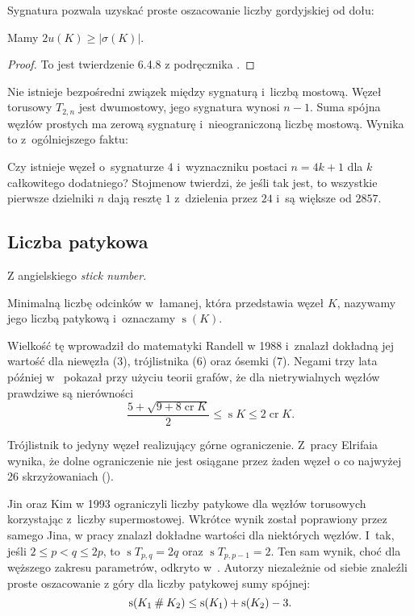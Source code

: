 Sygnatura pozwala uzyskać proste oszacowanie liczby gordyjskiej od dołu:

\begin{proposition}
    Mamy $2 u(K) \ge |\sigma(K)|$.
\end{proposition}

\begin{proof}
    To jest twierdzenie 6.4.8 z podręcznika \cite{murasugi96}.
\end{proof}

Nie istnieje bezpośredni związek między sygnaturą i~liczbą mostową.
Węzeł torusowy $T_{2,n}$ jest dwumostowy, jego sygnatura wynosi $n - 1$.
Suma spójna węzłów prostych ma zerową sygnaturę i~nieograniczoną liczbę mostową.
Wynika to z~ogólniejszego faktu:


Czy istnieje węzeł o~sygnaturze $4$ i~wyznaczniku postaci $n = 4k + 1$ dla $k$ całkowitego dodatniego?
Stojmenow twierdzi, że jeśli tak jest, to wszystkie pierwsze dzielniki $n$ dają resztę $1$ z~dzielenia przez $24$ i~są większe od $2857$.


\subsection{Liczba patykowa} %
\label{sub:stick_index}
Z angielskiego \emph{stick number}.

\begin{definition}
	Minimalną liczbę odcinków w~łamanej, która przedstawia węzeł $K$, nazywamy jego liczbą patykową i~oznaczamy $\operatorname{s}(K)$.
\end{definition}

Wielkość tę wprowadził do matematyki Randell w 1988 i~znalazł dokładną jej wartość dla niewęzła (3), trójlistnika (6) oraz ósemki (7).
Negami trzy lata później w~\cite{negami91} pokazał przy użyciu teorii grafów, że dla nietrywialnych węzłów prawdziwe są nierówności
\begin{equation}
    \frac{5+\sqrt{9 + 8 \operatorname{cr} K}}{2} \le \operatorname{s} K \le 2 \operatorname{cr} K.
\end{equation}

Trójlistnik to jedyny węzeł realizujący górne ograniczenie.
Z~pracy Elrifaia wynika, że dolne ograniczenie nie jest osiągane przez żaden węzeł o co najwyżej 26 skrzyżowaniach (\cite{elrifai06}).

Jin oraz Kim w 1993 ograniczyli liczby patykowe dla węzłów torusowych korzystając z~liczby supermostowej.
Wkrótce wynik został poprawiony przez samego Jina, w pracy \cite{jin97} znalazł dokładne wartości dla niektórych węzłów.
I~tak, jeśli $2 \le p < q \le 2p$, to $\operatorname{s} T_{p,q} = 2q$ oraz $\operatorname{s} T_{p, p-1} = 2$.
Ten sam wynik, choć dla węższego zakresu parametrów, odkryto w~\cite{greilsheimer97}.
Autorzy niezależnie od siebie znaleźli proste oszacowanie z góry dla liczby patykowej sumy spójnej:
\begin{equation}
	\operatorname{s}(K_1 \mathbin{\#} K_2) \le \operatorname{s}(K_1) + \operatorname{s}(K_2) - 3.
\end{equation}

